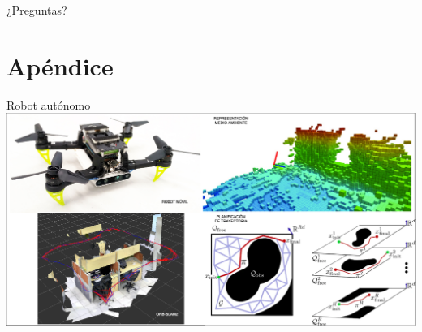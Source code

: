 \documentclass[24pt,aspectratio=169]{beamer}
\begin{document}

\begin{frame}[standout]
  ¿Preguntas?
\end{frame}

\appendix

\section{Apéndice}

\begin{frame}{Robot autónomo}
  \centering
  \includegraphics[width=\linewidth]{ANTECEDENTES}\\
\end{frame}
\end{document}
